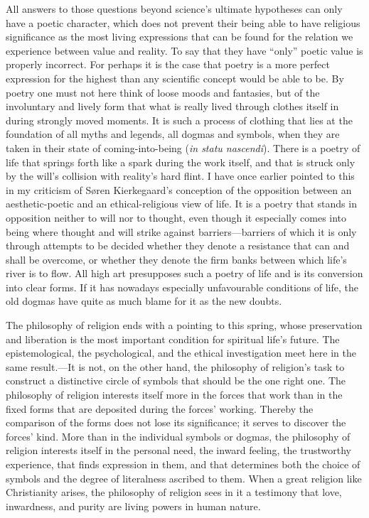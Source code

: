 \documentclass[12pt,a4paper]{book}
\newcommand{\opage}[1]{\marginnote{\footnotesize\textit{[#1]}}}
\begin{document}
All answers to those questions beyond science's ultimate hypotheses can only have a poetic character, which
does not prevent their being able to have religious significance as the most living expressions that can be
found for the relation we experience between value and reality. To say that they have ``only'' poetic value
is properly incorrect. For perhaps it is the case that poetry is a more perfect expression for the highest
than any scientific concept would be able to be. By poetry one must not here think of loose moods and
fantasies, but of the involuntary and lively form that what is really lived through clothes itself in during
strongly moved moments. It is such a process of clothing that lies at the foundation of all myths and
legends, all dogmas and symbols, when they are taken in their state of coming-into-being (\textit{in statu
nascendi}). There is a poetry of life that springs forth like a spark during the work itself, and that is
struck only by the will's collision with reality's hard flint. I have once earlier pointed to this in my
criticism of Søren Kierkegaard's conception of the opposition between an aesthetic-poetic and an
ethical-religious view of life. It is a poetry that stands in opposition neither to will nor to thought, even
though it especially comes into being where thought and will strike against barriers---barriers of which it
is only through attempts to be decided whether they denote a resistance that can and shall be overcome, or
whether they denote the firm banks between which life's river is to flow. All high art presupposes such a
poetry of life and is its conversion into clear forms. If it has 
\opage{241}nowadays especially unfavourable conditions
of life, the old dogmas have quite as much blame for it as the new doubts.

The philosophy of religion ends with a pointing to this spring, whose preservation and liberation is the most
important condition for spiritual life's future. The epistemological, the psychological, and the ethical
investigation meet here in the same result.---It is not, on the other hand, the philosophy of religion's task
to construct a distinctive circle of symbols that should be the one right one. The philosophy of religion
interests itself more in the forces that work than in the fixed forms that are deposited during the forces'
working. Thereby the comparison of the forms does not lose its significance; it serves to discover the
forces' kind. More than in the individual symbols or dogmas, the philosophy of religion interests itself in
the personal need, the inward feeling, the trustworthy experience, that finds expression in them, and that
determines both the choice of symbols and the degree of literalness ascribed to them. When a great religion
like Christianity arises, the philosophy of religion sees in it a testimony that love, inwardness, and purity
are living powers in human nature.
\end{document}
